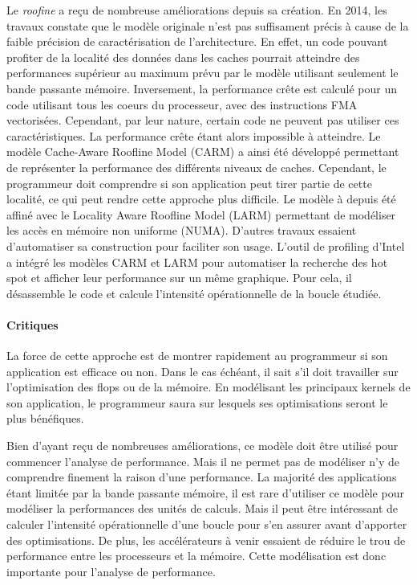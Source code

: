 Le \textit{roofine} a reçu de nombreuse améliorations depuis sa création. En 2014, les travaux \cite{Ilic2014} constate que le modèle originale n’est pas suffisament précis à cause de la faible précision de caractérisation de l’architecture. En effet, un code pouvant profiter de la localité des données dans les caches pourrait atteindre des performances supérieur au maximum prévu par le modèle utilisant seulement le bande passante mémoire. Inversement, la performance crête est calculé pour un code utilisant tous les coeurs du processeur, avec des instructions FMA vectorisées. Cependant, par leur nature, certain code ne peuvent pas utiliser ces  caractéristiques. La performance crête étant alors impossible à atteindre. Le modèle Cache-Aware Roofline Model (CARM) \cite{Ilic2014} a ainsi été développé permettant de représenter la performance des différents niveaux de caches. Cependant, le programmeur doit comprendre si son application peut tirer partie de cette localité, ce qui peut rendre cette approche plus difficile. Le modèle à depuis été affiné avec le Locality Aware Roofline Model (LARM) \cite{Denoyelle2018} permettant de modéliser les accès en mémoire non uniforme (NUMA).
D’autres travaux essaient d’automatiser sa construction \cite{lo2014roofline} pour faciliter son usage. L’outil de profiling d’Intel a intégré les modèles CARM et LARM pour automatiser la recherche des hot spot et afficher leur performance sur un même graphique. Pour cela, il désassemble le code et calcule l’intensité opérationnelle de la boucle étudiée.


\paragraph{Critiques}

La force de cette approche est de montrer rapidement au programmeur si son application est efficace ou non. Dans le cas échéant, il sait s’il doit travailler sur l’optimisation des flops ou de la mémoire. En modélisant les principaux kernels de son application, le programmeur saura sur lesquels ses optimisations seront le plus bénéfiques.

Bien d’ayant reçu de nombreuses améliorations, ce modèle doit être utilisé pour commencer l’analyse de performance. Mais il ne permet pas de modéliser n’y de comprendre finement la raison d’une performance.
La majorité des applications étant limitée par la bande passante mémoire, il est rare d’utiliser ce modèle pour modéliser la performances des unités de calculs. Mais il peut être intéressant de calculer l’intensité opérationnelle d’une boucle pour s’en assurer avant d’apporter des optimisations. De plus, les accélérateurs à venir essaient de réduire le trou de performance entre les processeurs et la mémoire. Cette modélisation est donc importante pour l’analyse de performance.
